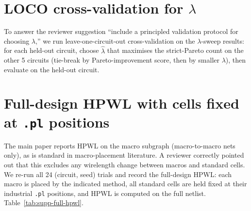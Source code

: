 \documentclass{article}
\begin{document}
\begin{table}[h]
\centering
\small

\caption{Classifier-guidance ($w\in\{2,8\}$, the two best per-circuit
legality weights) and RePaint ($t_\text{start}\in\{0.3, 0.5\}$,
the two best $t_\text{start}$) at all $4$ seeds.  Replaces the earlier
seed-$42$-only sweep on this slice.}
\label{tab:supp-baseline-sweeps-24}
\end{table}

\section{LOCO cross-validation for $\lambda$}
\label{sec:supp-lambda-loco}

To answer the reviewer suggestion ``include a principled validation
protocol for choosing $\lambda$,'' we run leave-one-circuit-out
cross-validation on the $\lambda$-sweep results: for each held-out
circuit, choose $\hat\lambda$ that maximises the strict-Pareto count on
the other 5 circuits (tie-break by Pareto-improvement score, then by
smaller $\lambda$), then evaluate on the held-out circuit.

\begin{table}[h]
\centering
\small

\caption{LOCO cross-validation for $\lambda$ selection on the
$\lambda$-sweep results.  $\hat\lambda$ is chosen on the 5 held-in
circuits (objective: strict-Pareto count, tie-break smaller $\lambda$);
$\Delta v$ and $\Delta h$ are evaluated on the held-out circuit.
``Oracle $\lambda^\star$'' is the per-circuit best $\lambda$ that minimises
$\Delta h$ subject to $\Delta v < 0$.  All 6 folds select
$\hat\lambda{=}8$, and held-out test gives \textbf{$6/6$ strict-Pareto
improvement} matching the per-circuit oracle.  This is the principled
selection rule.  Raw rows: \texttt{results/vsr\_extra/lambda\_loco.csv}.}
\label{tab:supp-lambda-loco}
\end{table}

\section{Full-design HPWL with cells fixed at \texttt{.pl} positions}
\label{sec:supp-full-hpwl}

The main paper reports HPWL on the macro subgraph (macro-to-macro nets
only), as is standard in macro-placement literature.  A reviewer
correctly pointed out that this excludes any wirelength change between
macros and standard cells.  We re-run all 24 (circuit, seed) trials and
record the full-design HPWL: each macro is placed by the indicated
method, all standard cells are held fixed at their industrial
\texttt{.pl} positions, and HPWL is computed on the full netlist.
Table~\ref{tab:supp-full-hpwl}.
\end{document}
